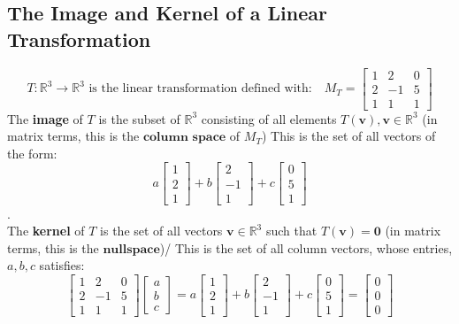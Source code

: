 \documentclass[a4paper, 9pt]{extarticle}
\begin{document}
\subsection{The Image and Kernel of a Linear Transformation}
$$
  \text{$T:\mathbb{R}^3 \to \mathbb{R}^3$ is the linear transformation defined with:} \quad
  M_T = \begin{bmatrix}
    1 & 2  & 0 \\
    2 & -1 & 5 \\
    1 & 1  & 1
  \end{bmatrix}
$$
The \textbf{image} of $T$ is the subset of $\mathbb{R}^3$ consisting of all elements $T(\mathbf{v}), \mathbf{v} \in \mathbb{R}^3$ (in matrix terms, this is the $\textbf{column space}$ of $M_T$) This is the set of all vectors of the form:
$$
  a \begin{bmatrix}
    1 \\
    2 \\
    1
  \end{bmatrix}
  +
  b \begin{bmatrix}
    2  \\
    -1 \\
    1
  \end{bmatrix}
  +
  c \begin{bmatrix}
    0 \\
    5 \\
    1
  \end{bmatrix}
$$
. \\
The \textbf{kernel} of $T$ is the set of all vectors $\mathbf{v} \in \mathbb{R}^3$ such that $T(\mathbf{v}) = \mathbf{0}$ (in matrix terms, this is the $\textbf{nullspace}$)/ This is the set of all column vectors, whose entries, $a,b,c$ satisfies:
$$
  \begin{bmatrix}
    1 & 2  & 0 \\
    2 & -1 & 5 \\
    1 & 1  & 1
  \end{bmatrix}
  \begin{bmatrix}
    a \\
    b \\
    c
  \end{bmatrix}
  =
  a \begin{bmatrix}
    1 \\
    2 \\
    1
  \end{bmatrix}
  +
  b \begin{bmatrix}
    2  \\
    -1 \\
    1
  \end{bmatrix}
  +
  c \begin{bmatrix}
    0 \\
    5 \\
    1
  \end{bmatrix}
  =
  \begin{bmatrix}
    0 \\
    0 \\
    0
  \end{bmatrix}
$$
\end{document}
